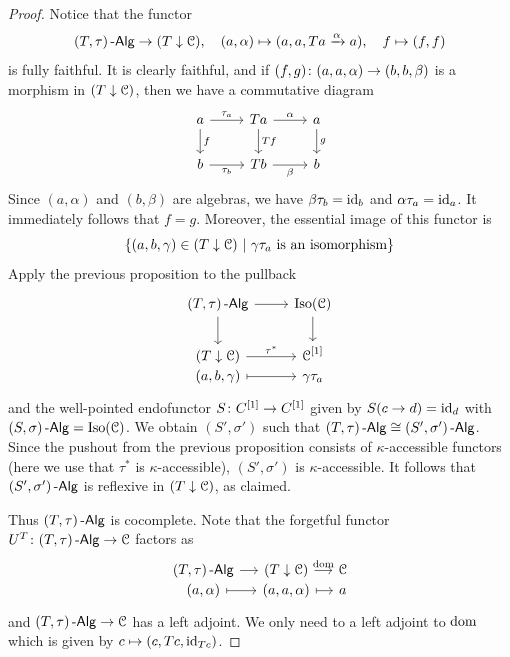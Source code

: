 \documentclass[a4paper,11pt,oneside,openany]{scrbook}
\begin{document}
\begin{proof}
    Notice that the functor 
    \begin{displaymath}
	(T,\tau)\operatorname{-\mathsf{Alg}} \to (T \downarrow \operatorname{\mathcal{C}}), \quad (a,\alpha) \mapsto (a,a,Ta \xrightarrow{\alpha} a), \quad f \mapsto (f,f)
    \end{displaymath}
    is fully faithful.
    It is clearly faithful, and if $ (f,g)\colon (a,a,\alpha) \to (b,b,\beta) $
    is a morphism in $ (T \downarrow \operatorname{\mathcal{C}}) $, then we have a commutative diagram
    \begin{displaymath}
        \begin{tikzcd}
	    a \arrow[d,"f"]\arrow[r, "\tau_a"]& Ta \arrow[d, "Tf"] \arrow[r, "\alpha"] & a\arrow[d, "g"]\\
	    b\arrow[r,"\tau_b"'] & Tb \arrow[r, "\beta"']& b
        \end{tikzcd}
    \end{displaymath}
    Since $ (a,\alpha) $ and $ (b,\beta) $ are algebras, we have $ \beta\tau_b = \operatorname{id}_b $ and $ \alpha \tau_a = \operatorname{id}_a $.
    It immediately follows that $ f = g $.
    Moreover, the essential image of this functor is
    \begin{displaymath}
         \{(a,b,\gamma)\in (T\downarrow\C)\ |\ \gamma\tau_a \text{ is an isomorphism}\} 
    \end{displaymath}
    Apply the previous proposition to the pullback
    \begin{displaymath}
        \begin{tikzcd}
	    (T,\tau)\Alg \arrow[d]\arrow[r] & \operatorname{Iso}(\C) \arrow[d]\\
	    (T\downarrow\C) \arrow[r, "\tau^*"] & \C^{[1]}\\[-2.1em]
	    (a,b,\gamma)\arrow[r, mapsto] & \gamma\tau_a
        \end{tikzcd}
    \end{displaymath}	
    and the well-pointed endofunctor $ S\colon C^{[1]} \to C^{[1]} $ given by $ S(c\to d) = \operatorname{id}_{d} $ with $ (S,\sigma)\operatorname{-\mathsf{Alg}} = \operatorname{Iso}(\operatorname{\mathcal{C}}) $.
    We obtain $ (S',\sigma') $ such that $ (T,\tau)\operatorname{-\mathsf{Alg}} \cong (S',\sigma')\operatorname{-\mathsf{Alg}} $.
    Since the pushout from the previous proposition consists of $ \kappa $-accessible functors (here we use that $ \tau^* $ is $ \kappa $-accessible), $ (S',\sigma') $ is $ \kappa $-accessible.
    It follows that $ (S',\sigma')\operatorname{-\mathsf{Alg}} $ is reflexive in $ (T\downarrow\operatorname{\mathcal{C}}) $, as claimed.
    
    Thus $ (T,\tau)\operatorname{-\mathsf{Alg}} $ is cocomplete.
    Note that the forgetful functor $ U^T \colon (T,\tau)\operatorname{-\mathsf{Alg}} \to \operatorname{\mathcal{C}} $ factors as
    \begin{displaymath}
	\begin{tikzcd}[column sep = small]
	    (T,\tau)\Alg \arrow[r]& (T\downarrow\C)\arrow[r,"\text{dom}"] & \C  \\[-2.1em]
	    (a,\alpha) \arrow[r,mapsto] & (a,a,\alpha) \arrow[r,mapsto] & a
	 \end{tikzcd}
    \end{displaymath}
    and $ (T,\tau)\operatorname{-\mathsf{Alg}} \to \operatorname{\mathcal{C}} $ has a left adjoint.
    We only need to a left adjoint to $ \operatorname{dom} $ which is given by $ c \mapsto (c,Tc, \operatorname{id}_{Tc}) $.
\end{proof}
\end{document}

